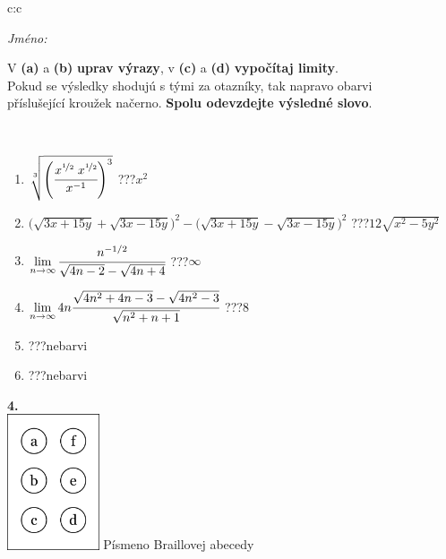 \documentclass[10pt]{report}
\begin{document}
\begin{tabular}{c:c}
\begin{minipage}[c][104.5mm][t]{0.5\linewidth}
\begin{center}
\textit{Jméno:}\phantom{xxxxxxxxxxxxxxxxxxxxxxxxxxxxxxxxxxxxxxxxxxxxxxxxxxxxxxxxxxxxxxxxx}\\[5mm]
\begin{minipage}{0.95\linewidth}
\begin{center}
V \textbf{(a)} a \textbf{(b)} \textbf{uprav výrazy}, v \textbf{(c)} a \textbf{(d)} \textbf{vypočítaj limity}.\\Pokud se výsledky shodujú s tými za otazníky, tak napravo obarvi\\příslušející kroužek načerno. \textbf{Spolu odevzdejte výsledné slovo}.
\end{center}
\end{minipage}
\\[1mm]
\begin{minipage}{0.79\linewidth}
\begin{center}
\begin{varwidth}{\linewidth}
\begin{enumerate}
\small
\item $\sqrt[3]{\left(\cfrac{x^{\nicefrac{1}{2}}\;x^{\nicefrac{1}{2}}}{x^{-1}}\right)^{3}}$\quad \dotfill\; ???\;\dotfill \quad $x^{2}$
\item {\footnotesize{\scriptsize$\big(\sqrt{3x+15y}+\sqrt{3x-15y}\big)^2-\big(\sqrt{3x+15y}-\sqrt{3x-15y}\big)^2$}\quad \dotfill\; ???\;\dotfill \quad $12\sqrt{x^2-5y^2}$}
\item $\lim\limits_{n\to\infty}\cfrac{n^{-1/2}}{\sqrt{4n-2}-\sqrt{4n+4}}$\quad \dotfill\; ???\;\dotfill \quad $\infty$
\item $\lim\limits_{n\to\infty}4n\cfrac{\sqrt{4n^2+4n-3}-\sqrt{4n^2-3}}{\sqrt{n^2+n+1}}$\quad \dotfill\; ???\;\dotfill \quad $8$
\item \quad \dotfill\; ???\;\dotfill \quad nebarvi
\item \quad \dotfill\; ???\;\dotfill \quad nebarvi
\end{enumerate}
\end{varwidth}
\end{center}
\end{minipage}
\begin{minipage}{0.20\linewidth}
\begin{center}
{\Huge\bfseries 4.} \\[2mm]
\includegraphics[height=40mm]{../images/braille.png}
{\small Písmeno Braillovej abecedy}
\end{center}
\end{minipage}
\end{center}
\end{minipage}
%
\end{tabular}
\end{document}
